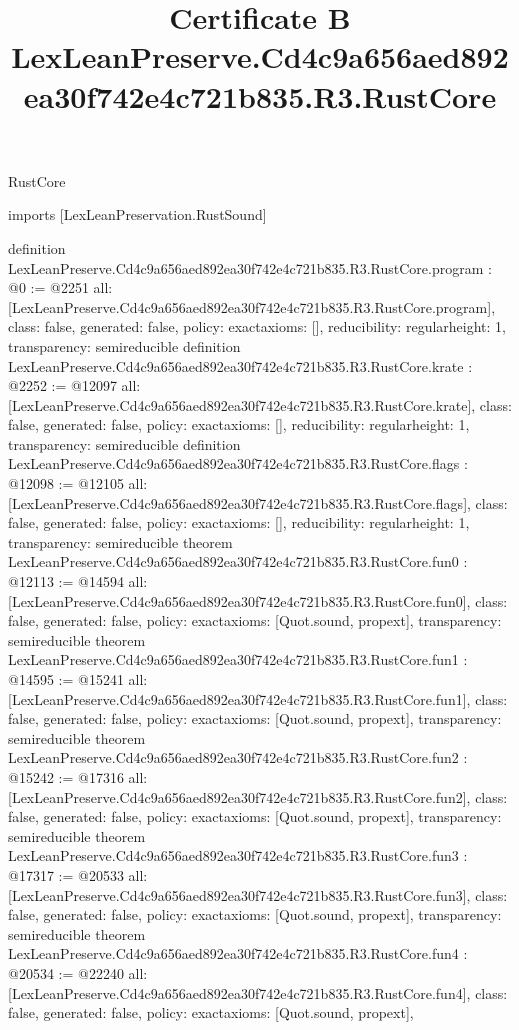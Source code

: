 \begin{lexlean}{RustCore}
\title{Certificate B LexLeanPreserve.Cd4c9a656aed892ea30f742e4c721b835.R3.RustCore}
\begin{coremodule}
imports [LexLeanPreservation.RustSound]

definition LexLeanPreserve.Cd4c9a656aed892ea30f742e4c721b835.R3.RustCore.program : @0 := @2251 {
  all: [LexLeanPreserve.Cd4c9a656aed892ea30f742e4c721b835.R3.RustCore.program],
  class: false,
  generated: false,
  policy: exact{axioms: []},
  reducibility: regular{height: 1},
  transparency: semireducible
}
definition LexLeanPreserve.Cd4c9a656aed892ea30f742e4c721b835.R3.RustCore.krate : @2252 := @12097 {
  all: [LexLeanPreserve.Cd4c9a656aed892ea30f742e4c721b835.R3.RustCore.krate],
  class: false,
  generated: false,
  policy: exact{axioms: []},
  reducibility: regular{height: 1},
  transparency: semireducible
}
definition LexLeanPreserve.Cd4c9a656aed892ea30f742e4c721b835.R3.RustCore.flags : @12098 := @12105 {
  all: [LexLeanPreserve.Cd4c9a656aed892ea30f742e4c721b835.R3.RustCore.flags],
  class: false,
  generated: false,
  policy: exact{axioms: []},
  reducibility: regular{height: 1},
  transparency: semireducible
}
theorem LexLeanPreserve.Cd4c9a656aed892ea30f742e4c721b835.R3.RustCore.fun0 : @12113 := @14594 {
  all: [LexLeanPreserve.Cd4c9a656aed892ea30f742e4c721b835.R3.RustCore.fun0],
  class: false,
  generated: false,
  policy: exact{axioms: [Quot.sound, propext]},
  transparency: semireducible
}
theorem LexLeanPreserve.Cd4c9a656aed892ea30f742e4c721b835.R3.RustCore.fun1 : @14595 := @15241 {
  all: [LexLeanPreserve.Cd4c9a656aed892ea30f742e4c721b835.R3.RustCore.fun1],
  class: false,
  generated: false,
  policy: exact{axioms: [Quot.sound, propext]},
  transparency: semireducible
}
theorem LexLeanPreserve.Cd4c9a656aed892ea30f742e4c721b835.R3.RustCore.fun2 : @15242 := @17316 {
  all: [LexLeanPreserve.Cd4c9a656aed892ea30f742e4c721b835.R3.RustCore.fun2],
  class: false,
  generated: false,
  policy: exact{axioms: [Quot.sound, propext]},
  transparency: semireducible
}
theorem LexLeanPreserve.Cd4c9a656aed892ea30f742e4c721b835.R3.RustCore.fun3 : @17317 := @20533 {
  all: [LexLeanPreserve.Cd4c9a656aed892ea30f742e4c721b835.R3.RustCore.fun3],
  class: false,
  generated: false,
  policy: exact{axioms: [Quot.sound, propext]},
  transparency: semireducible
}
theorem LexLeanPreserve.Cd4c9a656aed892ea30f742e4c721b835.R3.RustCore.fun4 : @20534 := @22240 {
  all: [LexLeanPreserve.Cd4c9a656aed892ea30f742e4c721b835.R3.RustCore.fun4],
  class: false,
  generated: false,
  policy: exact{axioms: [Quot.sound, propext]},
}
\end{coremodule}
\end{lexlean}
